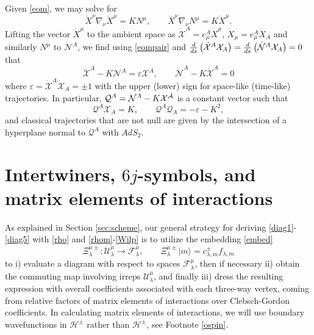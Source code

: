 \documentclass[12pt]{article}
\newcommand{\be}{\begin{equation}}
\newcommand{\ee}{\end{equation}}
\newcommand*{\ket}[1]{|{#1}\rangle}
\newcommand{\vep}{\varepsilon}
\newcommand{\calF}{\mathcal{F}}
\newcommand{\calH}{\mathcal{H}}
\newcommand{\calN}{\mathcal{N}}
\newcommand{\calQ}{\mathcal{Q}}
\newcommand{\calU}{\mathcal{U}}
\newcommand{\calX}{\mathcal{X}}
\DeclareMathOperator{\AdS}{AdS}
\newcommand{\lam}{\lambda}
\newcommand{\ov}{\over}
\def\widetilde#1{#1}%
\def\AdS{AdS}
\begin{document}
Given \eqref{eom}, we may solve for
\be \label{eompair}
\dot{X}^{\nu}\nabla_{\nu}\dot{X}^{\mu}=K N^{\mu}, \qquad \dot{X}^{\nu}\nabla_{\nu}N^{\mu}=K \dot{X}^{\mu}.
\ee
Lifting the vector $\dot{X}^{\mu}$ to the ambient space as $\dot{\calX}^{A}=e_{\mu}^{A}\dot{X}^{\mu}$, $\dot{X}_{\mu}=e_{\mu}^{A}\dot{X}_{A}$ and similarly $N^{\mu}$ to $\calN^{A}$, we find using \eqref{eompair} and ${d \ov ds}\left(\dot{\calX}^{A}\calX_{A}\right)={d \ov ds}\left(\dot{\calN}^{A}\calX_{A}\right)=0$ that
\be
\ddot{\calX}^{A}-K \calN^{A}=\vep \calX^{A}, \qquad \dot{\calN}^{A}-K \dot{\calX}^{A}=0
\ee
where $\vep =\dot{\calX}^{A}\dot{\calX}_{A}= \pm 1 $ with the upper (lower) sign for space-like (time-like) trajectories. In particular, $\calQ^{A}=\calN^{A}-K \cal{X}^{A}$ is a constant vector such that
\be
\calQ^{A}\calX_{A}=K, \qquad \calQ^{A}\calQ_{A}=-\vep-K^2,
\ee
and classical trajectories that are not null are given by the intersection of a hyperplane normal to $\calQ^{A}$ with $\AdS_2$.


\section{Intertwiners, $6j$-symbols, and matrix elements of interactions}\label{app:calc}
As explained in Section \ref{sec:scheme}, our general strategy for deriving \eqref{diag1}-\eqref{diag5} with \eqref{rho} and \eqref{rhom}-\eqref{Wilp} is to utilize the embedding \eqref{embed}
\be \label{embedA}
\Xi^{\mu \pm}_{\lam}: \calU^{\mu}_{\lambda} \to  \calF^{\mu}_{\lam},\qquad  \Xi^{\mu \pm}_{\lam}\ket{m}=c^{\pm}_{\lam, m}f_{\lam, m}
\ee
to i) evaluate a diagram with respect to spaces $\calF^{\mu}_{\lam}$, then if necessary ii) obtain the commuting map involving irreps $\calU_{\lam}^{\mu}$, and finally iii) dress the resulting expression with overall coefficients associated with each three-way vertex, coming from relative factors of matrix elements of interactions over Clebsch-Gordon coefficients. In calculating matrix elements of interactions, we will use boundary wavefunctions in $\calH^{\pm}$ rather than $\widetilde{\calH}^{\pm}$, see Footnote \ref{ospin}.
\end{document}
